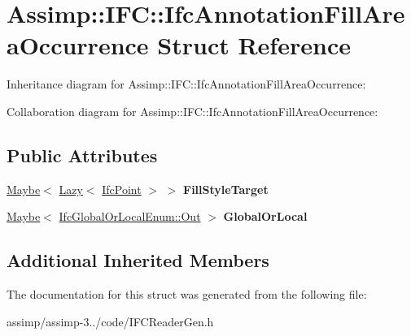 \hypertarget{struct_assimp_1_1_i_f_c_1_1_ifc_annotation_fill_area_occurrence}{\section{Assimp\+:\+:I\+F\+C\+:\+:Ifc\+Annotation\+Fill\+Area\+Occurrence Struct Reference}
\label{struct_assimp_1_1_i_f_c_1_1_ifc_annotation_fill_area_occurrence}
}


Inheritance diagram for Assimp\+:\+:I\+F\+C\+:\+:Ifc\+Annotation\+Fill\+Area\+Occurrence\+:


Collaboration diagram for Assimp\+:\+:I\+F\+C\+:\+:Ifc\+Annotation\+Fill\+Area\+Occurrence\+:
\subsection*{Public Attributes}
\begin{DoxyCompactItemize}
\item 
\hypertarget{struct_assimp_1_1_i_f_c_1_1_ifc_annotation_fill_area_occurrence_a672deb97621b5c01e49b69e11a002c9c}{\hyperlink{struct_assimp_1_1_s_t_e_p_1_1_maybe}{Maybe}$<$ \hyperlink{struct_assimp_1_1_s_t_e_p_1_1_lazy}{Lazy}$<$ \hyperlink{struct_assimp_1_1_i_f_c_1_1_ifc_point}{Ifc\+Point} $>$ $>$ {\bfseries Fill\+Style\+Target}}\label{struct_assimp_1_1_i_f_c_1_1_ifc_annotation_fill_area_occurrence_a672deb97621b5c01e49b69e11a002c9c}

\item 
\hypertarget{struct_assimp_1_1_i_f_c_1_1_ifc_annotation_fill_area_occurrence_a6215cc35bf6c5bd0d3b25f6c35a92e53}{\hyperlink{struct_assimp_1_1_s_t_e_p_1_1_maybe}{Maybe}$<$ \hyperlink{classboost_1_1shared__ptr}{Ifc\+Global\+Or\+Local\+Enum\+::\+Out} $>$ {\bfseries Global\+Or\+Local}}\label{struct_assimp_1_1_i_f_c_1_1_ifc_annotation_fill_area_occurrence_a6215cc35bf6c5bd0d3b25f6c35a92e53}

\end{DoxyCompactItemize}
\subsection*{Additional Inherited Members}


The documentation for this struct was generated from the following file\+:\begin{DoxyCompactItemize}
\item 
assimp/assimp-\/3../code/I\+F\+C\+Reader\+Gen.\+h\end{DoxyCompactItemize}
